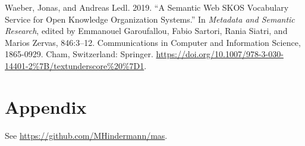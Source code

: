 \begin{CSLReferences}{1}{0}
\leavevmode\hypertarget{ref-Waeber.2019}{}%
Waeber, Jonas, and Andreas Ledl. 2019. {``A Semantic Web SKOS Vocabulary
Service for Open Knowledge Organization Systems.''} In \emph{Metadata
and Semantic Research}, edited by Emmanouel Garoufallou, Fabio Sartori,
Rania Siatri, and Marios Zervas, 846:3--12. Communications in Computer
and Information Science, 1865-0929. Cham, Switzerland: Springer.
\url{https://doi.org/10.1007/978-3-030-14401-2\%7B/textunderscore\%20\%7D1}.

\end{CSLReferences}

\hypertarget{appendix}{%
	\section{Appendix}\label{appendix}}

See \url{https://github.com/MHindermann/mas}.
